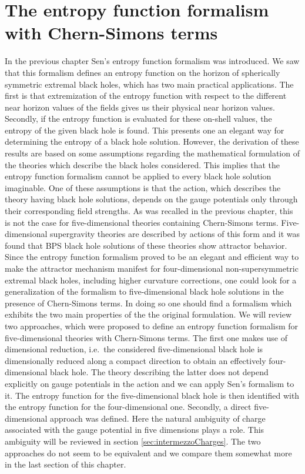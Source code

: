\documentclass[12pt,twoside]{book}
\begin{document}
\chapter{The entropy function formalism with Chern-Simons terms}
\label{ch:entrFunc&CS}

In the previous chapter Sen's entropy function formalism was introduced. We saw that this formalism defines an entropy function on the horizon of spherically symmetric extremal black holes, which has two main practical applications. The first is that extremization of the entropy function with respect to the different near horizon values of the fields gives us their physical near horizon values. Secondly, if the entropy function is evaluated for these on-shell values, the entropy of the given black hole is found. This presents one an elegant way for determining the entropy of a black hole solution. However, the derivation of these results are based on some assumptions regarding the mathematical formulation of the theories which describe the black holes considered. This implies that the entropy function formalism cannot be applied to every black hole solution imaginable. One of these assumptions is that the action, which describes the theory having black hole solutions, depends on the gauge potentials only through their corresponding field strengths. As was recalled in the previous chapter, this is not the case for five-dimensional theories containing Chern-Simons terms. Five-dimensional supergravity theories are described by actions of this form and it was found that BPS black hole solutions of these theories show attractor behavior. Since the entropy function formalism proved to be an elegant and efficient way to make the attractor mechanism manifest for four-dimensional non-supersymmetric extremal black holes, including higher curvature corrections, one could look for a generalization of the formalism to five-dimensional black hole solutions in the presence of Chern-Simons terms. In doing so one should find a formalism which exhibits the two main properties of the the original formulation. We will review two approaches, which were proposed to define an entropy function formalism for five-dimensional theories with Chern-Simons terms. The first one makes use of dimensional reduction, i.e.\ the considered five-dimensional black hole is dimensionally reduced along a compact direction to obtain an effectively four-dimensional black hole. The theory describing the latter does not depend explicitly on gauge potentials in the action and we can apply Sen's formalism to it. The entropy function for the five-dimensional black hole is then identified with the entropy function for the four-dimensional one. Secondly, a direct five-dimensional approach was defined. Here the natural ambiguity of charge associated with the gauge potential in five dimensions plays a role. This ambiguity will be reviewed in section \ref{sec:intermezzoCharges}. The two approaches do not seem to be equivalent and we compare them somewhat more in the last section of this chapter.
\end{document}

